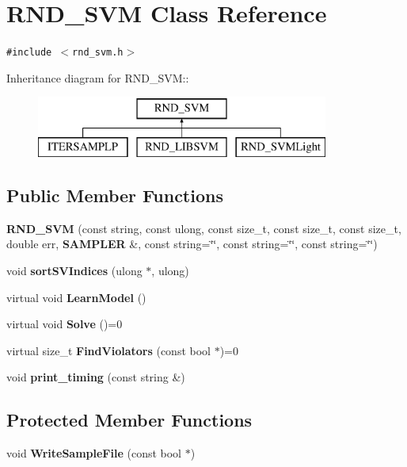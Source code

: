 \section{RND\_\-SVM Class Reference}
\label{classRND__SVM}
{\tt \#include $<$rnd\_\-svm.h$>$}

Inheritance diagram for RND\_\-SVM::\begin{figure}[H]
\begin{center}
\leavevmode
\includegraphics[height=2cm]{classRND__SVM}
\end{center}
\end{figure}
\subsection*{Public Member Functions}
\begin{CompactItemize}
\item 
\textbf{RND\_\-SVM} (const string, const ulong, const size\_\-t, const size\_\-t, const size\_\-t, double err, {\bf SAMPLER} \&, const string=\char`\"{}\char`\"{}, const string=\char`\"{}\char`\"{}, const string=\char`\"{}\char`\"{})\label{classRND__SVM_3c3642b0b6b946b6e897618749b0c0cd}

\item 
void \textbf{sortSVIndices} (ulong $\ast$, ulong)\label{classRND__SVM_6ac3b9bc3c953eb02d02ca9d09ad134b}

\item 
virtual void \textbf{LearnModel} ()\label{classRND__SVM_80aa9b843199c149c359f132a5d188ab}

\item 
virtual void \textbf{Solve} ()=0\label{classRND__SVM_5fb6b96cdfcc77e6386874ab93542604}

\item 
virtual size\_\-t \textbf{FindViolators} (const bool $\ast$)=0\label{classRND__SVM_0330c6934beb24038c1030d9e56b76b4}

\item 
void \textbf{print\_\-timing} (const string \&)\label{classRND__SVM_fb6f34b3c3614ba6333b3981a4efb079}

\end{CompactItemize}
\subsection*{Protected Member Functions}
\begin{CompactItemize}
\item 
void \textbf{WriteSampleFile} (const bool $\ast$)\label{classRND__SVM_ecdca7a3d1988a4cc733d88f91389048}

\end{CompactItemize}
